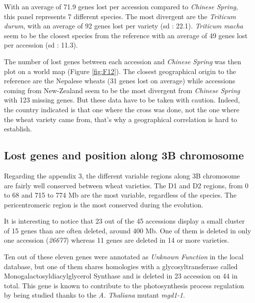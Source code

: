\documentclass[a4paper, 12pt]{article}
\begin{document}
\begin{onehalfspace}
With an average of 71.9 genes lost per accession compared to \textit{Chinese Spring}, this panel represents 7 different species. The most divergent are the \textit{Triticum durum}, with an average of 92 genes lost per variety (sd : 22.1). \textit{Triticum macha} seem to be the closest species from the reference with an average of 49 genes lost per accession (sd : 11.3).

The number of lost genes between each accession and \textit{Chinese Spring} was then plot on a world map (Figure \ref{fig:F12}). The closest geographical origin to the reference are the Nepalese wheats (31 genes lost on average) while accessions coming from New-Zealand seem to be the most divergent from \textit{Chinese Spring} with 123 missing genes. But these data have to be taken with caution. Indeed, the country indicated is that one where the cross was done, not the one where the wheat variety came from, that's why a geographical correlation is hard to establish.

        \subsection{Lost genes and position along 3B chromosome}

Regarding the appendix 3, the different variable regions along 3B chromosome are fairly well conserved between wheat varieties. The D1 and D2 regions, from 0 to 68 and 715 to 774 Mb are the most variable, regardless of the species. The pericentromeric region is the most conserved during the evolution.

It is interesting to notice that 23 out of the 45 accessions display a small cluster of 15 genes than are often deleted, around 400 Mb. One of them is deleted in only one accession (\textit{26677}) whereas 11 genes are deleted in 14 or more varieties. 

Ten out of these eleven genes were annotated as \textit{Unknown Function} in the local database, but one of them shares homologies with a glycosyltransferase called Monogalactosyldiacylglycerol Synthase and is deleted in 23 accession on 44 in total. This gene is known to contribute to the photosynthesis process regulation by being studied thanks to the \textit{A. Thaliana} mutant \textit{mgd1-1}.


\end{onehalfspace}
\end{document}
